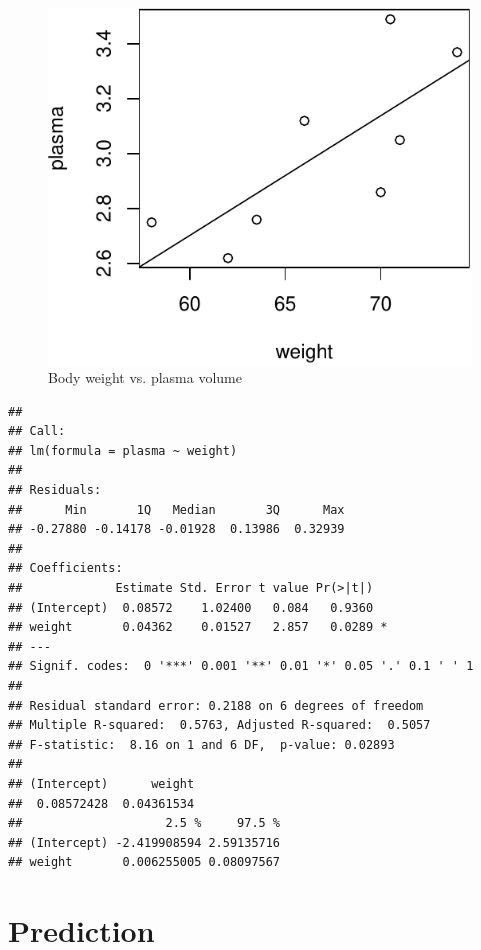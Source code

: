 \documentclass[]{article}
\begin{document}
\begin{figure}[H]

{\centering \includegraphics{session-regression-I-files/figures/unnamed-chunk-3-1} 

}

\caption{Body weight vs. plasma volume}\label{fig:unnamed-chunk-3}
\end{figure}

\begin{verbatim}
## 
## Call:
## lm(formula = plasma ~ weight)
## 
## Residuals:
##      Min       1Q   Median       3Q      Max 
## -0.27880 -0.14178 -0.01928  0.13986  0.32939 
## 
## Coefficients:
##             Estimate Std. Error t value Pr(>|t|)  
## (Intercept)  0.08572    1.02400   0.084   0.9360  
## weight       0.04362    0.01527   2.857   0.0289 *
## ---
## Signif. codes:  0 '***' 0.001 '**' 0.01 '*' 0.05 '.' 0.1 ' ' 1
## 
## Residual standard error: 0.2188 on 6 degrees of freedom
## Multiple R-squared:  0.5763, Adjusted R-squared:  0.5057 
## F-statistic:  8.16 on 1 and 6 DF,  p-value: 0.02893
## 
## (Intercept)      weight 
##  0.08572428  0.04361534 
##                    2.5 %     97.5 %
## (Intercept) -2.419908594 2.59135716
## weight       0.006255005 0.08097567
\end{verbatim}

\hypertarget{prediction}{%
\section{Prediction}\label{prediction}}
\end{document}
